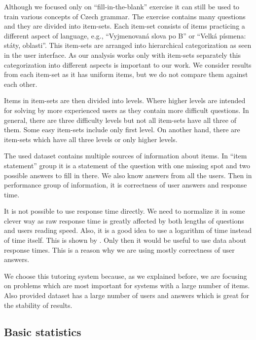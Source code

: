\documentclass[
  digital, %
  table,   %
  nolof,     %
  nolot,     %
  nocover,
  color,
  final, %
]{fithesis3}
\begin{document}
Although we focused only on ``fill-in-the-blank'' exercise it can still be used to train various concepts of Czech grammar. The exercise contains many questions and they are divided into item-sets. Each item-set consists of items practicing a different aspect of language, e.g., ``Vyjmenovaná slova po B'' or ``Velká písmena: státy, oblasti''. This item-sets are arranged into hierarchical categorization as seen in the user interface. As our analysis works only with item-sets separately this categorization into different aspects is important to our work. We consider results from each item-set as it has uniform items, but we do not compare them against each other.

Items in item-sets are then divided into levels. Where higher levels are intended for solving by more experienced users as they contain more difficult questions. In general, there are three difficulty levels but not all item-sets have all three of them. Some easy item-sets include only first level. On another hand, there are item-sets which have all three levels or only higher levels.


The used dataset contains multiple sources of information about items. In ``item statement'' group it is a statement of the question with one missing spot and two possible answers to fill in there. We also know answers from all the users. Then in performance group of information, it is correctness of user answers and response time.

It is not possible to use response time directly. We need to normalize it in some clever way as raw response time is greatly affected by both lengths of questions and users reading speed. Also, it is a good idea to use a logarithm of time instead of time itself. This is shown by \citeauthor{niznan2014using}\cite{niznan2014using}. Only then it would be useful to use data about response times. This is a reason why we are using mostly correctness of user answers.


We choose this tutoring system because, as we explained before, we are focusing on problems which are most important for systems with a large number of items. Also provided dataset has a large number of users and answers which is great for the stability of results.


\subsection{Basic statistics}\label{basic-statistics}
\end{document}
